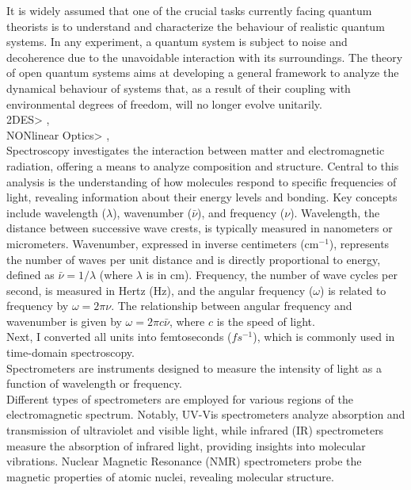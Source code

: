 It is widely assumed that one of the crucial tasks currently facing quantum theorists
is to understand and characterize the behaviour of realistic quantum systems. In
any experiment, a quantum system is subject to noise and decoherence due to the
unavoidable interaction with its surroundings. The theory of open quantum systems
aims at developing a general framework to analyze the dynamical behaviour of systems
that, as a result of their coupling with environmental degrees of freedom, will no
longer evolve unitarily. \cite{rivasetal2010markovianmasterequations}
\\
2DES> %
\cite{segarra-martietal2018accuratesimulationtwodimensional}, \cite{sunetal2024twodimensionalspectroscopyopen}
\\
NONlinear Optics> \cite{hamm2005principlesnonlinearoptical}, \cite{mukamel1995principlesnonlinearoptical}
\\
Spectroscopy investigates the interaction between matter and electromagnetic radiation, offering a means to analyze composition and structure.
Central to this analysis is the understanding of how molecules respond to specific frequencies of light, revealing information about their energy levels and bonding.
Key concepts include wavelength ($\lambda$), wavenumber ($\bar{\nu}$), and frequency ($\nu$).
Wavelength, the distance between successive wave crests, is typically measured in nanometers or micrometers.
Wavenumber, expressed in inverse centimeters (cm$^{-1}$), represents the number of waves per unit distance and is directly proportional to energy, defined as $\bar{\nu} = 1/\lambda$ (where $\lambda$ is in cm).
Frequency, the number of wave cycles per second, is measured in Hertz (Hz), and the angular frequency ($\omega$) is related to frequency by $\omega = 2\pi\nu$.
The relationship between angular frequency and wavenumber is given by $\omega = 2\pi c \bar{\nu}$, where $c$ is the speed of light.\\
Next, I converted all units into femtoseconds ($fs^{-1}$), which is commonly used in time-domain spectroscopy.\\
Spectrometers are instruments designed to measure the intensity of light as a function of wavelength or frequency.\\
Different types of spectrometers are employed for various regions of the electromagnetic spectrum.
Notably, UV-Vis spectrometers analyze absorption and transmission of ultraviolet and visible light, while infrared (IR) spectrometers measure the absorption of infrared light, providing insights into molecular vibrations.
Nuclear Magnetic Resonance (NMR) spectrometers probe the magnetic properties of atomic nuclei, revealing molecular structure.
